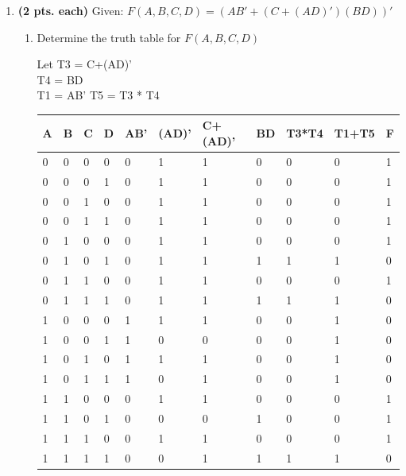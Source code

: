 \begin{enumerate}
\item {\bf(2 pts. each)} Given: $F(A,B,C,D) = (AB' + (C+(AD)')(BD))'$
\begin{enumerate}
	\item Determine the truth table for $F(A,B,C,D)$

\begin{solution}{ 
Let T3 = C+(AD)'\\
T4 = BD\\
T1 = AB'
T5 = T3 * T4\\

\begin{tabular}{l|l|l|l|l|l|l|l|l|l|l} 
 A &  B &  C &  D & AB' & (AD)' & C+(AD)' & BD & T3*T4 & T1+T5  &  F \\ \hline
 0 &  0 &  0 &  0 &  0  &  1    &  1      &  0 & 0     &  0     &  1  \\ \hline
 0 &  0 &  0 &  1 &  0 &  1 &  1 &  0 & 0 &  0 &  1  \\ \hline
 0 &  0 &  1 &  0 &  0 &  1 &  1 &  0 & 0 &  0 &  1  \\ \hline
 0 &  0 &  1 &  1 &  0 &  1 &  1 &  0 & 0 &  0 &  1  \\ \hline
 0 &  1 &  0 &  0 &  0 &  1 &  1 &  0 & 0 &  0 &  1  \\ \hline
 0 &  1 &  0 &  1 &  0 &  1 &  1 &  1 & 1 &  1 &  0  \\ \hline
 0 &  1 &  1 &  0 &  0 &  1 &  1 &  0 & 0 &  0 &  1  \\ \hline
 0 &  1 &  1 &  1 &  0 &  1 &  1 &  1 & 1 &  1 &  0  \\ \hline
 1 &  0 &  0 &  0 &  1 &  1 &  1 &  0 & 0 &  1 &  0  \\ \hline
 1 &  0 &  0 &  1 &  1 &  0 &  0 &  0 & 0 &  1 &  0  \\ \hline
 1 &  0 &  1 &  0 &  1 &  1 &  1 &  0 & 0 &  1 &  0  \\ \hline
 1 &  0 &  1 &  1 &  1 &  0 &  1 &  0 & 0 &  1 &  0  \\ \hline
 1 &  1 &  0 &  0 &  0 &  1 &  1 &  0 & 0 &  0 &  1  \\ \hline
 1 &  1 &  0 &  1 &  0 &  0 &  0 &  1 & 0 &  0 &  1  \\ \hline
 1 &  1 &  1 &  0 &  0 &  1 &  1 &  0 & 0 &  0 &  1  \\ \hline
 1 &  1 &  1 &  1 &  0 &  0 &  1 &  1 & 1 &  1 &  0  \\  
\end{tabular} 
} \end{solution}


\end{enumerate}
\end{enumerate}
